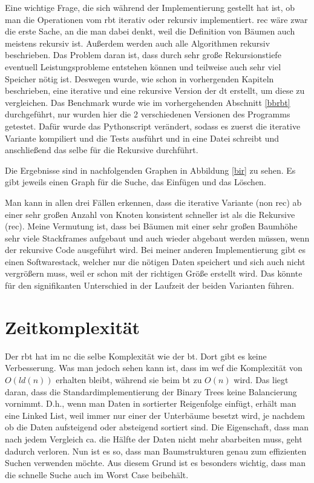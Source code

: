\documentclass[11pt]{article}
\begin{document}
Eine wichtige Frage, die sich während der Implementierung gestellt hat ist, ob man die Operationen vom \gls{rbt} iterativ oder rekursiv implementiert. 
\gls{rec} wäre zwar die erste Sache, an die man dabei denkt, weil die Definition von Bäumen auch meistens rekursiv ist. Außerdem werden auch alle Algorithmen rekursiv beschrieben. 
Das Problem daran ist, dass durch sehr große Rekursionstiefe eventuell Leistungsprobleme entstehen können und teilweise auch sehr viel Speicher nötig ist. 
Deswegen wurde, wie schon in vorhergenden Kapiteln beschrieben, eine iterative und eine rekursive Version der \gls{dt} erstellt, um diese zu vergleichen.
Das Benchmark wurde wie im vorhergehenden Abschnitt \ref{bbrbt} durchgeführt, nur wurden hier die 2 verschiedenen Versionen des Programms getestet.
Dafür wurde das Pythonscript verändert, sodass es zuerst die iterative Variante kompiliert und die Tests ausführt und in eine Datei schreibt und anschließend das selbe für die Rekursive durchführt. 

Die Ergebnisse sind in nachfolgenden Graphen in Abbildung \ref{bir} zu sehen. Es gibt jeweils einen Graph für die Suche, das Einfügen und das Löschen.

Man kann in allen drei Fällen erkennen, dass die iterative Variante (non rec) ab einer sehr großen Anzahl von Knoten konsistent schneller ist als die Rekursive (rec).
Meine Vermutung ist, dass bei Bäumen mit einer sehr großen Baumhöhe sehr viele Stackframes aufgebaut und auch wieder abgebaut werden müssen, wenn der rekursive Code ausgeführt wird.
Bei meiner anderen Implementierung gibt es einen Softwarestack, welcher nur die nötigen Daten speichert und sich auch nicht vergrößern muss, weil er schon mit der richtigen Größe erstellt wird.
Das könnte für den signifikanten Unterschied in der Laufzeit der beiden Varianten führen.

\section{Zeitkomplexität} \label{time}

Der \gls{rbt} hat im \gls{nc} die selbe Komplexität wie der \gls{bt}. Dort gibt es keine Verbesserung.
Was man jedoch sehen kann ist, dass im \gls{wcf} die Komplexität von $O(ld(n))$ erhalten bleibt, während sie beim \gls{bt} zu $O(n)$ wird.
Das liegt daran, dass die Standardimplementierung der Binary Trees keine Balancierung vornimmt. D.h., wenn man Daten in sortierter Reigenfolge einfügt, 
erhält man eine Linked List, weil immer nur einer der Unterbäume besetzt wird, je nachdem ob die Daten aufsteigend oder absteigend sortiert sind. Die Eigenschaft, 
dass man nach jedem Vergleich ca. die Hälfte der Daten nicht mehr abarbeiten muss, geht dadurch verloren. 
Nun ist es so, dass man Baumstrukturen genau zum effizienten Suchen verwenden möchte. Aus diesem Grund ist es besonders wichtig, dass man die schnelle Suche auch im Worst Case beibehält.
\end{document}
